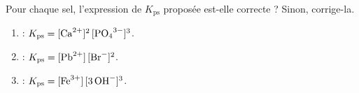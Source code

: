 \documentclass[11pt,a4paper]{article}
\begin{document}
\begin{exo}
Pour chaque sel, l'expression de $K_{\mathrm{ps}}$ proposée est-elle correcte ? Sinon, corrige-la.
\begin{enumerate}[label=\alph*)]
  \item {} : $K_{\mathrm{ps}} = [\ce{Ca^{2+}}]^{2}\,[\ce{PO4^{3-}}]^{3}$.
  \item {} : $K_{\mathrm{ps}} = [\ce{Pb^{2+}}]\,[\ce{Br-}]^{2}$.
  \item {} : $K_{\mathrm{ps}} = [\ce{Fe^{3+}}]\,[3\,\ce{OH-}]^{3}$.
\end{enumerate}
\end{exo}
\end{document}

